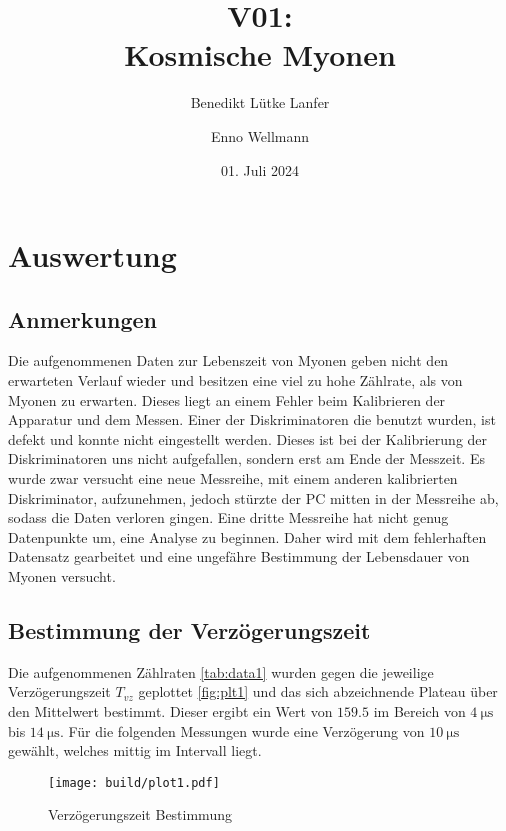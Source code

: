 

\title{V01:\\ Kosmische Myonen}
\author{Benedikt Lütke Lanfer \and Enno Wellmann}
\date{01. Juli 2024}
\publishers{TU Dortmund – Fakultät Physik}



\tableofcontents
\newpage



\section{Auswertung}
\subsection{Anmerkungen}
Die aufgenommenen Daten zur Lebenszeit von Myonen geben nicht den erwarteten Verlauf wieder und besitzen eine viel zu hohe Zählrate, als von Myonen zu erwarten.
Dieses liegt an einem Fehler beim Kalibrieren der Apparatur und dem Messen. 
Einer der Diskriminatoren die benutzt wurden, ist defekt und konnte nicht eingestellt werden. 
Dieses ist bei der Kalibrierung der Diskriminatoren uns nicht aufgefallen, sondern erst am Ende der Messzeit. 
Es wurde zwar versucht eine neue Messreihe, mit einem anderen kalibrierten Diskriminator, aufzunehmen, 
jedoch stürzte der PC mitten in der Messreihe ab, sodass die Daten verloren gingen. 
Eine dritte Messreihe hat nicht genug Datenpunkte um, eine Analyse zu beginnen. 
Daher wird mit dem fehlerhaften Datensatz gearbeitet und eine ungefähre Bestimmung der Lebensdauer von Myonen versucht.    

\subsection{Bestimmung der Verzögerungszeit}
Die aufgenommenen Zählraten \eqref{tab:data1} wurden gegen die jeweilige Verzögerungszeit $T_{vz}$ geplottet \eqref{fig:plt1} 
und das sich abzeichnende Plateau über den Mittelwert bestimmt. Dieser ergibt ein Wert von $\num{159.5}$ im Bereich von $\qty{4}{\us}$ bis $\qty{14}{\us}$.
Für die folgenden Messungen wurde eine Verzögerung von $\qty{10}{\us}$ gewählt, welches mittig im Intervall liegt. 

\begin{figure}[H]
	\centering
	\texttt{[image: build/plot1.pdf]}
	\caption{Verzögerungszeit Bestimmung}\label{fig:plt1}
\end{figure}

